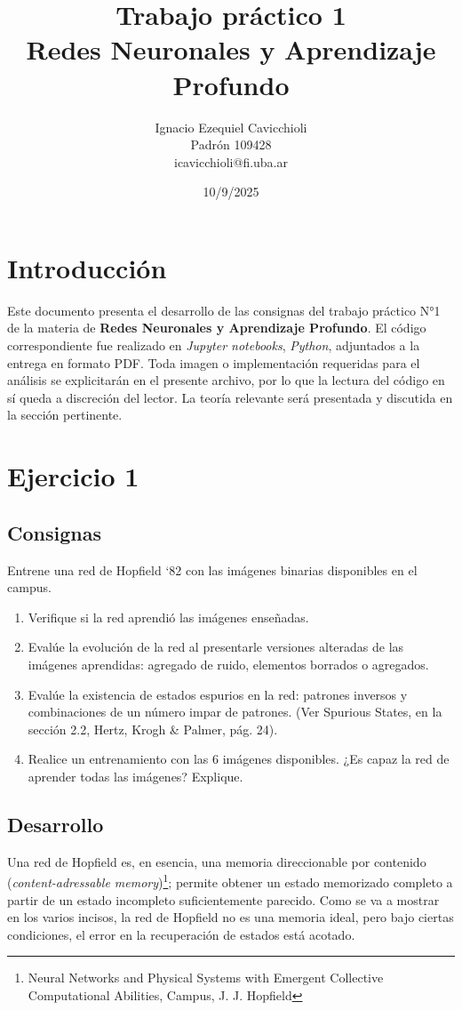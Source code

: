 \documentclass[11pt]{article} %
\title{Trabajo práctico 1\\ Redes Neuronales y Aprendizaje Profundo}
\author{Ignacio Ezequiel Cavicchioli\\Padrón 109428\\icavicchioli@fi.uba.ar}
\date{10/9/2025} %
\begin{document}
\maketitle
\section{Introducción}

Este documento presenta el desarrollo de las consignas del trabajo práctico N°1 de la materia de \textbf{Redes Neuronales y Aprendizaje Profundo}.  El código correspondiente fue realizado en  \textit{Jupyter notebooks}, \textit{Python}, adjuntados a la entrega en formato PDF. Toda imagen o implementación requeridas para el análisis se explicitarán en el presente archivo, por lo que la lectura del código en sí queda a discreción del lector. La teoría relevante será presentada y discutida en la sección pertinente.

\section{Ejercicio 1}

\subsection{Consignas}
Entrene una red de Hopfield ‘82 con las imágenes binarias disponibles en el campus. 
\begin{enumerate}[label=\alph*]
\item Verifique si la red aprendió las imágenes enseñadas.
\item Evalúe la evolución de la red al presentarle versiones alteradas de las imágenes
aprendidas: agregado de ruido, elementos borrados o agregados.
\item Evalúe la existencia de estados espurios en la red: patrones inversos y
combinaciones de un número impar de patrones. (Ver Spurious States, en la sección
2.2, Hertz, Krogh \& Palmer, pág. 24).
\item Realice un entrenamiento con las 6 imágenes disponibles. ¿Es capaz la red de
aprender todas las imágenes? Explique.
\end{enumerate}

\subsection{Desarrollo}

Una red de Hopfield es, en esencia, una memoria direccionable por contenido (\textit{content-adressable memory})\footnote{Neural Networks and Physical Systems with Emergent Collective Computational Abilities, Campus, J. J. Hopfield }; permite obtener un estado memorizado completo a partir de un estado incompleto suficientemente parecido. Como se va a mostrar en los varios incisos, la red de Hopfield no es una memoria ideal, pero bajo ciertas condiciones, el error en la recuperación de estados está acotado. 
\end{document}
